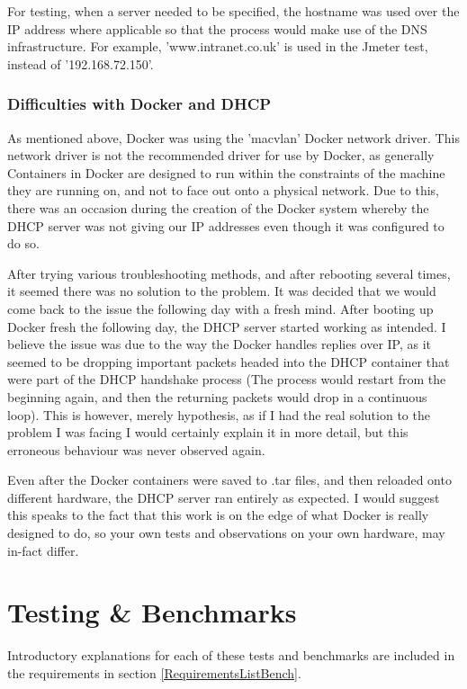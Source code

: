 For testing, when a server needed to be specified, the hostname was used over the IP address where applicable so that the process would make use of the DNS infrastructure. For example, 'www.intranet.co.uk' is used in the Jmeter test, instead of '192.168.72.150'.

\subsection{Difficulties with Docker and DHCP}
As mentioned above, Docker was using the 'macvlan' Docker network driver. This network driver is not the recommended driver for use by Docker, as generally Containers in Docker are designed to run within the constraints of the machine they are running on, and not to face out onto a physical network. Due to this, there was an occasion during the creation of the Docker system whereby the DHCP server was not giving our IP addresses even though it was configured to do so.

After trying various troubleshooting methods, and after rebooting several times, it seemed there was no solution to the problem. It was decided that we would come back to the issue the following day with a fresh mind. After booting up Docker fresh the following day, the DHCP server started working as intended. I believe the issue was due to the way the Docker handles replies over IP, as it seemed to be dropping important packets headed into the DHCP container that were part of the DHCP handshake process (The process would restart from the beginning again, and then the returning packets would drop in a continuous loop). This is however, merely hypothesis, as if I had the real solution to the problem I was facing I would certainly explain it in more detail, but this erroneous behaviour was never observed again. 

Even after the Docker containers were saved to .tar files, and then reloaded onto different hardware, the DHCP server ran entirely as expected. I would suggest this speaks to the fact that this work is on the edge of what Docker is really designed to do, so your own tests and observations on your own hardware, may in-fact differ.






\chapter{Testing \& Benchmarks}
Introductory explanations for each of these tests and benchmarks are included in the requirements in section \ref{RequirementsListBench}.

